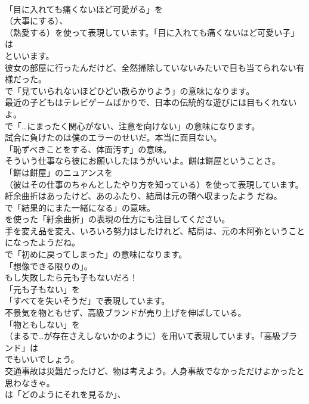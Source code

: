 \documentclass[8pt]{extreport}
\begin{document}
\begin{CJK}{UTF8}{min}
\\	「目に入れても痛くないほど可愛がる」を
\\	（大事にする）、
\\	（熱愛する）を使って表現しています。「目に入れても痛くないほど可愛い子」は 
\\	といいます。	
\\	彼女の部屋に行ったんだけど、全然掃除していないみたいで目も当てられない有様だった。 
\\	で「見ていられないほどひどい散らかりよう」の意味になります。	
\\	最近の子どもはテレビゲームばかりで、日本の伝統的な遊びには目もくれないよ。 
\\	で「…にまったく関心がない、注意を向けない」の意味になります。	
\\	試合に負けたのは僕のエラーのせいだ。本当に面目ない。 
\\	「恥ずべきことをする、体面汚す」の意味。	
\\	そういう仕事なら彼にお願いしたほうがいいよ。餅は餅屋ということさ。 
\\	「餅は餅屋」のニュアンスを
\\	（彼はその仕事のちゃんとしたやり方を知っている）を使って表現しています。	
\\	紆余曲折はあったけど、あのふたり、結局は元の鞘へ収まったよう だね。 
\\	で「結果的にまた一緒になる」の意味。
\\	を使った「紆余曲折」の表現の仕方にも注目してください。	
\\	手を変え品を変え、いろいろ努力はしたけれど、結局は、元の木阿弥ということになったようだね。 
\\	で「初めに戻ってしまった」の意味になります。
\\	「想像できる限りの」。	
\\	もし失敗したら元も子もないだろ！ 
\\	「元も子もない」を
\\	「すべてを失いそうだ」で表現しています。	
\\	不景気を物ともせず、高級ブランドが売り上げを伸ばしている。 
\\	「物ともしない」を 
\\	（まるで…が存在さえしないかのように）を用いて表現しています。「高級ブランド」は 
\\	でもいいでしょう。	
\\	交通事故は災難だったけど、物は考えよう。人身事故でなかっただけよかったと思わなきゃ。 
\\	は「どのようにそれを見るか」、 

\end{CJK}
\end{document}
